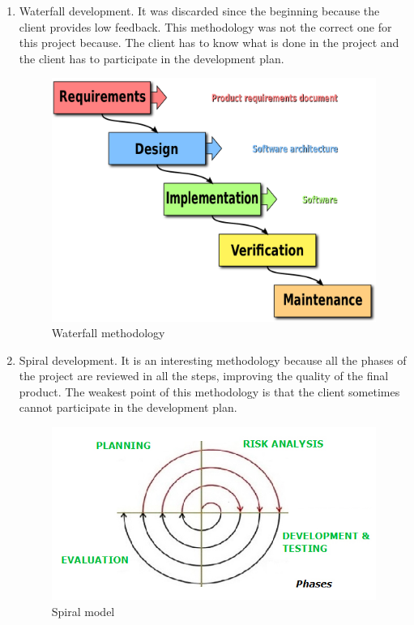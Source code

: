 \begin{enumerate}

\item Waterfall development. It was discarded since the beginning because the client provides low feedback. This methodology was not the correct one for this project because. The client has to know what is done in the project and the client has to participate in the development plan.

\begin{figure}[H]
\begin{centering}
\includegraphics[scale=0.2]{IMGS/waterfall_methodology.png}
\caption{Waterfall methodology \label{Waterfall methodology}}
\end{centering}
\end{figure} 

\item Spiral development. It is an interesting methodology because all the phases of the project are reviewed in all the steps, improving the quality of the final product. The weakest point of this methodology is that the client sometimes cannot participate in the development plan.

\begin{figure}[H]
\begin{centering}
\includegraphics[scale=0.5]{IMGS/spiral-model.jpg}
\caption{Spiral model \label{Spiral model}}
\end{centering}
\end{figure} 


\end{enumerate}
